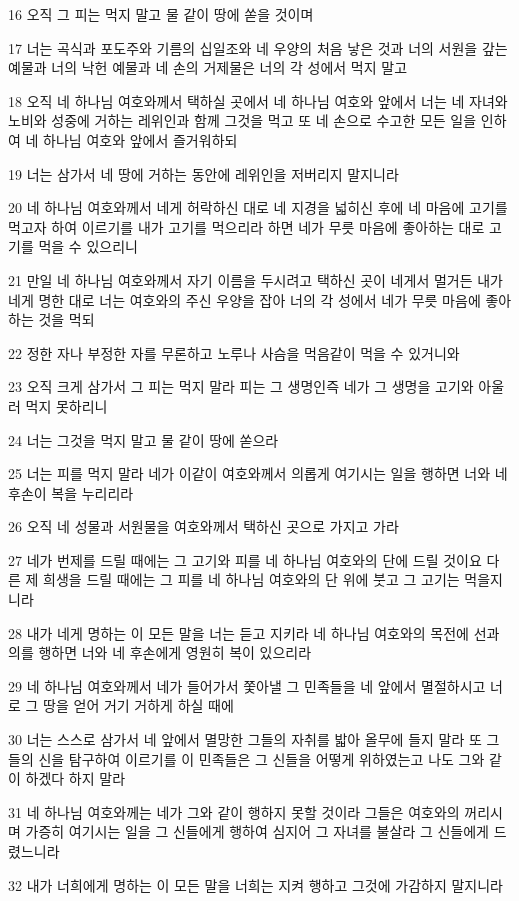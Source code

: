 \par 16 오직 그 피는 먹지 말고 물 같이 땅에 쏟을 것이며
\par 17 너는 곡식과 포도주와 기름의 십일조와 네 우양의 처음 낳은 것과 너의 서원을 갚는 예물과 너의 낙헌 예물과 네 손의 거제물은 너의 각 성에서 먹지 말고
\par 18 오직 네 하나님 여호와께서 택하실 곳에서 네 하나님 여호와 앞에서 너는 네 자녀와 노비와 성중에 거하는 레위인과 함께 그것을 먹고 또 네 손으로 수고한 모든 일을 인하여 네 하나님 여호와 앞에서 즐거워하되
\par 19 너는 삼가서 네 땅에 거하는 동안에 레위인을 저버리지 말지니라
\par 20 네 하나님 여호와께서 네게 허락하신 대로 네 지경을 넓히신 후에 네 마음에 고기를 먹고자 하여 이르기를 내가 고기를 먹으리라 하면 네가 무릇 마음에 좋아하는 대로 고기를 먹을 수 있으리니
\par 21 만일 네 하나님 여호와께서 자기 이름을 두시려고 택하신 곳이 네게서 멀거든 내가 네게 명한 대로 너는 여호와의 주신 우양을 잡아 너의 각 성에서 네가 무릇 마음에 좋아하는 것을 먹되
\par 22 정한 자나 부정한 자를 무론하고 노루나 사슴을 먹음같이 먹을 수 있거니와
\par 23 오직 크게 삼가서 그 피는 먹지 말라 피는 그 생명인즉 네가 그 생명을 고기와 아울러 먹지 못하리니
\par 24 너는 그것을 먹지 말고 물 같이 땅에 쏟으라
\par 25 너는 피를 먹지 말라 네가 이같이 여호와께서 의롭게 여기시는 일을 행하면 너와 네 후손이 복을 누리리라
\par 26 오직 네 성물과 서원물을 여호와께서 택하신 곳으로 가지고 가라
\par 27 네가 번제를 드릴 때에는 그 고기와 피를 네 하나님 여호와의 단에 드릴 것이요 다른 제 희생을 드릴 때에는 그 피를 네 하나님 여호와의 단 위에 붓고 그 고기는 먹을지니라
\par 28 내가 네게 명하는 이 모든 말을 너는 듣고 지키라 네 하나님 여호와의 목전에 선과 의를 행하면 너와 네 후손에게 영원히 복이 있으리라
\par 29 네 하나님 여호와께서 네가 들어가서 쫓아낼 그 민족들을 네 앞에서 멸절하시고 너로 그 땅을 얻어 거기 거하게 하실 때에
\par 30 너는 스스로 삼가서 네 앞에서 멸망한 그들의 자취를 밟아 올무에 들지 말라 또 그들의 신을 탐구하여 이르기를 이 민족들은 그 신들을 어떻게 위하였는고 나도 그와 같이 하겠다 하지 말라
\par 31 네 하나님 여호와께는 네가 그와 같이 행하지 못할 것이라 그들은 여호와의 꺼리시며 가증히 여기시는 일을 그 신들에게 행하여 심지어 그 자녀를 불살라 그 신들에게 드렸느니라
\par 32 내가 너희에게 명하는 이 모든 말을 너희는 지켜 행하고 그것에 가감하지 말지니라

